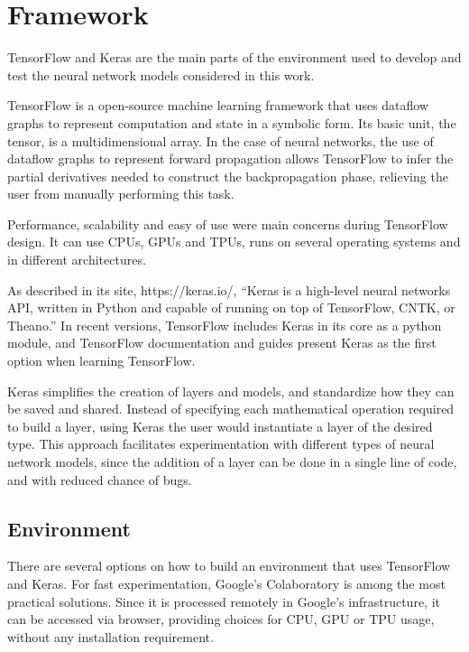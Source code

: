 \section{Framework}
TensorFlow and Keras are the main parts of the environment used to develop and test the neural network models considered in this work.

TensorFlow \cite{abadi_tensorflow:_2016} is a open-source machine learning framework that uses dataflow graphs to represent computation and state in a symbolic form. Its basic unit, the tensor, is a multidimensional array. In the case of neural networks, the use of dataflow graphs to represent forward propagation allows TensorFlow to infer the partial derivatives needed to construct the backpropagation phase, relieving the user from manually performing this task.

Performance, scalability and easy of use were main concerns during TensorFlow design. It can use CPUs, GPUs and TPUs, runs on several operating systems and in different architectures.

As described in its site, https://keras.io/\cite{chollet_keras_2019}, ``Keras is a high-level neural networks API, written in Python and capable of running on top of TensorFlow, CNTK, or Theano.'' In recent versions, TensorFlow includes Keras in its core as a python module, and TensorFlow documentation and guides present Keras as the first option when learning TensorFlow.

Keras simplifies the creation of layers and models, and standardize how they can be saved and shared. Instead of specifying each mathematical operation required to build a layer, using Keras the user would instantiate a layer of the desired type. This approach facilitates experimentation with different types of neural network models, since the addition of a layer can be done in a single line of code, and with reduced chance of bugs.


\subsection{Environment}

There are several options on how to build an environment that uses TensorFlow and Keras. For fast experimentation, Google's Colaboratory\cite{carneiro_performance_2018} is among the most practical solutions. Since it is processed remotely in Google's infrastructure, it can be accessed via browser, providing choices for CPU, GPU or TPU usage, without any installation requirement.

